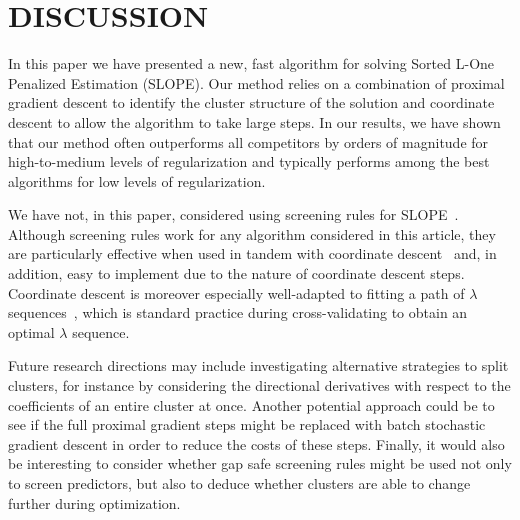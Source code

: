 \section{DISCUSSION}\label{sec:discussion}

In this paper we have presented a new, fast algorithm for solving Sorted L-One Penalized Estimation (SLOPE).
Our method relies on a combination of proximal gradient descent to identify the cluster structure of the solution and coordinate descent to allow the algorithm to take large steps.
In our results, we have shown that our method often outperforms all competitors by orders of magnitude for high-to-medium levels of regularization and typically performs among the best algorithms for low levels of regularization.

We have not, in this paper, considered using screening rules for SLOPE~\parencite{larsson2020c,elvira2022}.
Although screening rules work for any algorithm considered in this article, they are particularly effective when used in tandem with coordinate descent~\parencite{fercoq2015} and, in addition, easy to implement due to the nature of coordinate descent steps.
Coordinate descent is moreover especially well-adapted to fitting a path of \(\lambda\) sequences~\parencite{friedman2007,friedman2010}, which is standard practice during cross-validating to obtain an optimal \(\lambda\) sequence.

Future research directions may include investigating alternative strategies to split clusters, for instance by considering the directional derivatives with respect to the coefficients of an entire cluster at once.
Another potential approach could be to see if the full proximal gradient steps might be replaced with batch stochastic gradient descent in order to reduce the costs of these steps.
Finally, it would also be interesting to consider whether gap safe screening rules might be used not only to screen predictors, but also to deduce whether clusters are able to change further during optimization.

